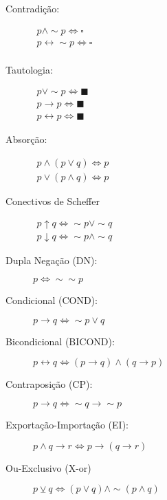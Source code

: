 \documentclass[12pt, a4paper,final]{article}
\begin{document}
\begin{description}
        \item[Contradição:] $\begin{array}{l} p\wedge \sim p \Leftrightarrow \square \\ p \leftrightarrow \sim p \Leftrightarrow \square \\ \end{array}$
        
        \item[Tautologia:] $ \begin{array}{l} p\vee \sim p \Leftrightarrow \blacksquare \\ p \rightarrow p \Leftrightarrow \blacksquare \\ p \leftrightarrow p \Leftrightarrow \blacksquare \end{array}$
        
        \item [Absorção:] $\begin{array}{l}p \wedge (p \vee q) \Leftrightarrow p\\p \vee (p \wedge q) \Leftrightarrow p\end{array}$
        
        \item[Conectivos de Scheffer] $\begin{array}{l} p \uparrow q \Leftrightarrow \sim p \vee \sim q \\  p \downarrow q \Leftrightarrow \sim p \wedge \sim q \end{array}$
        
        \item[Dupla Negação (DN):] $p\Leftrightarrow \sim \sim p$ 
        
        \item[Condicional (COND):] $p\rightarrow q \Leftrightarrow\sim p \vee q$
        
        \item[Bicondicional (BICOND):] $p\leftrightarrow q \Leftrightarrow (p\rightarrow q)\wedge(q\rightarrow p)$
        
        \item[Contraposição (CP):] $p\rightarrow q \Leftrightarrow \sim q\rightarrow\sim p$
        
        \item[Exportação-Importação (EI):] $p\wedge q\rightarrow r \Leftrightarrow p\rightarrow(q\rightarrow r)$
        
        \item[Ou-Exclusivo (X-or)] $p \veebar q \Leftrightarrow (p \vee q) \wedge \sim (p \wedge q)$
        
    \end{description}
    
\end{document}
